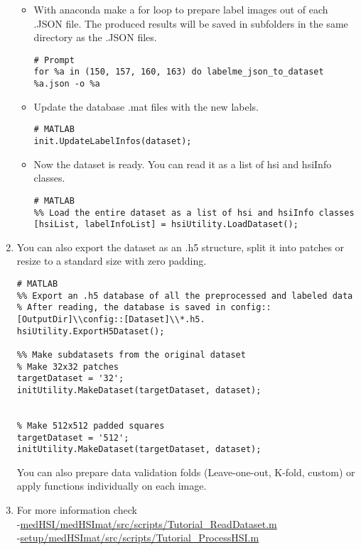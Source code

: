 \documentclass{foxelas_report}
\begin{document}
\begin{enumerate}
\begin{itemize}
\item With anaconda make a for loop to prepare label images out of each .JSON file. The produced results will be saved in subfolders in the same directory as the .JSON files. 

\begin{lstlisting}
# Prompt
for %a in (150, 157, 160, 163) do labelme_json_to_dataset %a.json -o %a
\end{lstlisting}

\item Update the database .mat files with the new labels.

\begin{lstlisting}
# MATLAB
init.UpdateLabelInfos(dataset);
\end{lstlisting}

\item Now the dataset is ready. You can read it as a list of hsi and hsiInfo classes.

\begin{lstlisting}
# MATLAB
%% Load the entire dataset as a list of hsi and hsiInfo classes
[hsiList, labelInfoList] = hsiUtility.LoadDataset();
\end{lstlisting}
\end{itemize}


\item You can also export the dataset as an .h5 structure, split it into patches or resize to a standard size with zero padding.

\begin{lstlisting}
# MATLAB
%% Export an .h5 database of all the preprocessed and labeled data
% After reading, the database is saved in config::[OutputDir]\\config::[Dataset]\\*.h5.
hsiUtility.ExportH5Dataset();

%% Make subdatasets from the original dataset
% Make 32x32 patches
targetDataset = '32';
initUtility.MakeDataset(targetDataset, dataset);


% Make 512x512 padded squares
targetDataset = '512';
initUtility.MakeDataset(targetDataset, dataset);

\end{lstlisting}

You can also prepare data validation folds (Leave-one-out, K-fold, custom) or apply functions individually on each image. 

\item For more information check \\
-\url{medHSI/medHSImat/src/scripts/Tutorial\_ReadDataset.m}\\
-\url{setup/medHSImat/src/scripts/Tutorial\_ProcessHSI.m}

\end{enumerate}


%
\end{document}
